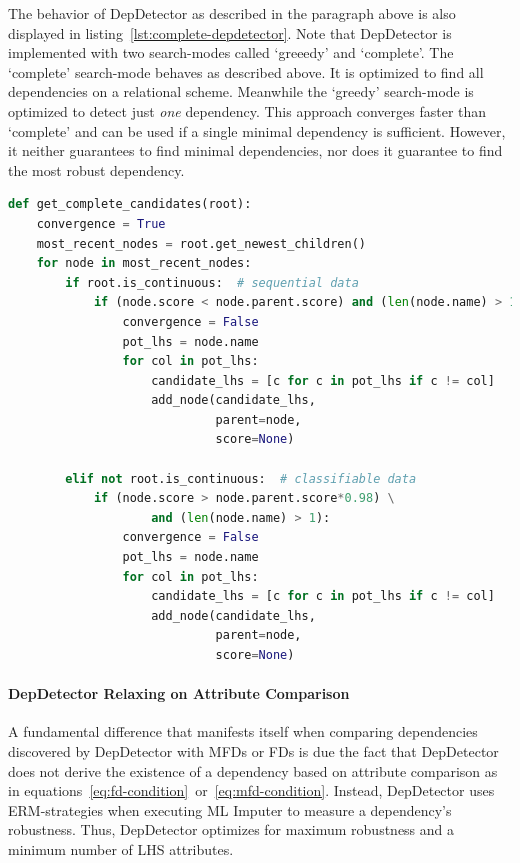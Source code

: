 The behavior of DepDetector as described in the paragraph above is also displayed in listing~\ref{lst:complete-depdetector}.
Note that DepDetector is implemented with two search-modes called `greeedy' and `complete'.
The `complete' search-mode behaves as described above.
It is optimized to find all dependencies on a relational scheme.
Meanwhile the `greedy' search-mode is optimized to detect just \emph{one} dependency.
This approach converges faster than `complete' and can be used if a single minimal dependency is sufficient.
However, it neither guarantees to find minimal dependencies, nor does it guarantee to find the most robust dependency.

\begin{lstlisting}[caption={`Complete' candidate generation in the DepDetector algorithm},captionpos=b,language=Python,label=lst:complete-depdetector]
def get_complete_candidates(root):
    convergence = True
    most_recent_nodes = root.get_newest_children()
    for node in most_recent_nodes:
        if root.is_continuous:  # sequential data
            if (node.score < node.parent.score) and (len(node.name) > 1):
                convergence = False
                pot_lhs = node.name
                for col in pot_lhs:
                    candidate_lhs = [c for c in pot_lhs if c != col]
                    add_node(candidate_lhs,
                             parent=node,
                             score=None)

        elif not root.is_continuous:  # classifiable data
            if (node.score > node.parent.score*0.98) \
                    and (len(node.name) > 1):
                convergence = False
                pot_lhs = node.name
                for col in pot_lhs:
                    candidate_lhs = [c for c in pot_lhs if c != col]
                    add_node(candidate_lhs,
                             parent=node,
                             score=None)
\end{lstlisting}

\paragraph{DepDetector Relaxing on Attribute Comparison}
A fundamental difference that manifests itself when comparing dependencies discovered by DepDetector with MFDs or FDs is due the fact that DepDetector does not derive the existence of a dependency based on attribute comparison as in equations~\ref{eq:fd-condition}~or~\ref{eq:mfd-condition}.
Instead, DepDetector uses ERM-strategies when executing ML Imputer to measure a dependency's robustness.
Thus, DepDetector optimizes for maximum robustness and a minimum number of LHS attributes.
